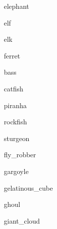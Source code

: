 \documentclass[letterpaper,serif]{module}
\begin{document}
\begin{newmonster}{elephant}\end{newmonster}

\begin{newmonster}{elf}\end{newmonster}

\begin{newmonster}{elk}\end{newmonster}

\begin{newmonster}{ferret}\end{newmonster}

\begin{newmonster}{bass}\end{newmonster}

\begin{newmonster}{catfish}\end{newmonster}

\begin{newmonster}{piranha}\end{newmonster}

\begin{newmonster}{rockfish}\end{newmonster}

\begin{newmonster}{sturgeon}\end{newmonster}

\begin{newmonster}{fly_robber}\end{newmonster}

\begin{newmonster}{gargoyle}\end{newmonster}

\begin{newmonster}{gelatinous_cube}\end{newmonster}

\begin{newmonster}{ghoul}\end{newmonster}

\begin{newmonster}{giant_cloud}\end{newmonster}
\end{document}

